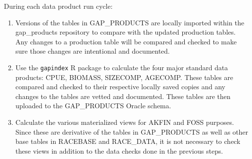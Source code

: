 \documentclass[
  letterpaper,
  oneside,
  open=any]{scrbook}
\begin{document}
During each data product run cycle:

\begin{enumerate}
\def\labelenumi{\arabic{enumi}.}
\item
  Versions of the tables in GAP\_PRODUCTS are locally imported within
  the gap\_products repository to compare with the updated production
  tables. Any changes to a production table will be compared and checked
  to make sure those changes are intentional and documented.
\item
  Use the \texttt{gapindex} R package to calculate the four major
  standard data products: CPUE, BIOMASS, SIZECOMP, AGECOMP. These tables
  are compared and checked to their respective locally saved copies and
  any changes to the tables are vetted and documented. These tables are
  then uploaded to the GAP\_PRODUCTS Oracle schema.
\item
  Calculate the various materialized views for AKFIN and FOSS purposes.
  Since these are derivative of the tables in GAP\_PRODUCTS as well as
  other base tables in RACEBASE and RACE\_DATA, it is not necessary to
  check these views in addition to the data checks done in the previous
  steps.
\end{enumerate}
\end{document}
